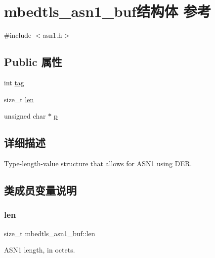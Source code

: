 \hypertarget{structmbedtls__asn1__buf}{}\section{mbedtls\+\_\+asn1\+\_\+buf结构体 参考}
\label{structmbedtls__asn1__buf}


{\ttfamily \#include $<$asn1.\+h$>$}

\subsection*{Public 属性}
\begin{DoxyCompactItemize}
\item 
int \hyperlink{structmbedtls__asn1__buf_abcca2df9a773acd5b59831ac55993dd1}{tag}
\item 
size\+\_\+t \hyperlink{structmbedtls__asn1__buf_a046821787f2c5ecbf2df9f15e0d9486c}{len}
\item 
unsigned char $\ast$ \hyperlink{structmbedtls__asn1__buf_a0af0cf9b0801a21ce4652e859876f195}{p}
\end{DoxyCompactItemize}


\subsection{详细描述}
Type-\/length-\/value structure that allows for A\+S\+N1 using D\+ER. 

\subsection{类成员变量说明}
\mbox{\label{structmbedtls__asn1__buf_a046821787f2c5ecbf2df9f15e0d9486c}} 
\subsubsection{\texorpdfstring{len}{len}}
{\footnotesize\ttfamily size\+\_\+t mbedtls\+\_\+asn1\+\_\+buf\+::len}

A\+S\+N1 length, in octets. \mbox{\label{structmbedtls__asn1__buf_a0af0cf9b0801a21ce4652e859876f195}} 
